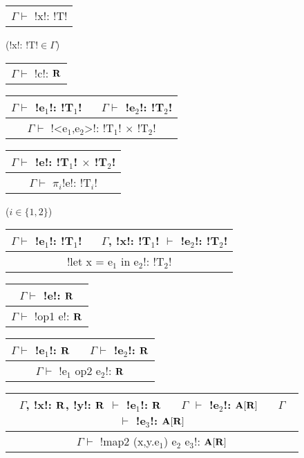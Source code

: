 \begin{figure*}[tb]
    \centering
    \begin{tabular}{c} 
    \\\hline
    $\Gamma \vdash$ !x!: !T!
    \end{tabular}(!x!: !T!$\in\Gamma$)
    \hspace{0.5cm}
    \begin{tabular}{c} 
        \\\hline
        $\Gamma \vdash$ !c!: $\mathbf{R}$
    \end{tabular}
    \hspace{0.5cm}
    \begin{tabular}{c}
    $\Gamma \vdash$ !e$_1$!: !T$_1$! $\quad$ $\Gamma \vdash$ !e$_2$!: !T$_2$! \\\hline  
    $\Gamma \vdash$ !<e$_1$,e$_2$>!: !T$_1$! $\times$ !T$_2$!
    \end{tabular}
    \hspace{0.5cm}
    \begin{tabular}{c}
        $\Gamma \vdash$ !e!: !T$_1$! $\times$ !T$_2$! \\\hline  
        $\Gamma \vdash$ $\pi_i$!e!: !T$_i$!
    \end{tabular}($i\in\{1,2\}$)

    \begin{tabular}{c}
    $\Gamma \vdash$ !e$_1$!: !T$_1$! $\quad$ $\Gamma$, !x!: !T$_1$! $\vdash$ !e$_2$!: !T$_2$! \\\hline
    !let x = e$_1$ in e$_2$!: !T$_2$!
    \end{tabular}
    \hspace{0.5cm}
    \begin{tabular}{c}
        $\Gamma \vdash$ !e!: $\mathbf{R}$ \\\hline  
        $\Gamma \vdash$ !op1 e!: $\mathbf{R}$
    \end{tabular}
    \hspace{0.5cm}
    \begin{tabular}{c}
        $\Gamma \vdash$ !e$_1$!: $\mathbf{R}$ $\quad$ $\Gamma \vdash$ !e$_2$!: $\mathbf{R}$ \\\hline  
        $\Gamma \vdash$ !e$_1$ op2 e$_2$!: $\mathbf{R}$
        \end{tabular}
 
    \begin{tabular}{c}
        $\Gamma$, !x!: $\mathbf{R}$, !y!: $\mathbf{R}$ $\vdash$ !e$_1$!: $\mathbf{R}$ 
        $\quad$ $\Gamma$ $\vdash$ !e$_2$!: $\mathbf{A}[\mathbf{R}]$
        $\quad$ $\Gamma$ $\vdash$ !e$_3$!: $\mathbf{A}[\mathbf{R}]$
        \\\hline  
        $\Gamma \vdash$ !map2 (x,y.e$_1$) e$_2$ e$_3$!: $\mathbf{A}[\mathbf{R}]$
    \end{tabular}


\end{figure*}
